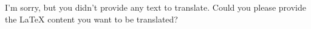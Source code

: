 I'm sorry, but you didn't provide any text to translate. Could you please provide the LaTeX content you want to be translated?
